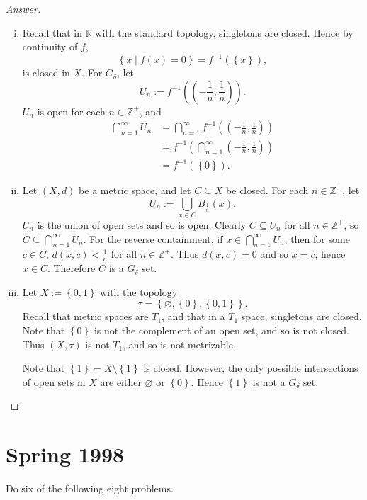\documentclass[12pt]{article}
\newcommand{\z}{\mathbb{Z}}
\newcommand{\real}{\mathbb{R}}
\newcommand\inv[1]{#1^{-1}}
\newcommand\paren[1]{\left( #1 \right)}
\newcommand\setb[1]{\left \{ #1 \right \}}
\theoremstyle{definition}
\begin{document}
\begin{proof}[Answer]
    \noindent
    \begin{enumerate}[(i)]
        \item Recall that in $\real$ with the standard topology, singletons are closed. Hence by continuity of $f$, 
        \[
            \setb{ x \mid f(x) = 0 } = \inv{f} \paren{ \setb{ x } },
        \]
        is closed in $X$. For $G_{\delta}$, let 
        \[
            U_n := \inv{f} \paren{ \paren{ -\frac{1}{n} , \frac{1}{n} } }.
        \]
        $U_n$ is open for each $n \in \z^+$, and 
        \begin{align*}
            \bigcap\limits_{n = 1}^{\infty} U_n & = \bigcap\limits_{n = 1}^{\infty} \inv{f} \paren{ \paren{ -\frac{1}{n} , \frac{1}{n} } } \\
            & = \inv{f} \paren{ \bigcap\limits_{n = 1}^{\infty} \paren{ -\frac{1}{n} , \frac{1}{n} } } \\
            & = \inv{f} \paren{ \setb{0} }.
        \end{align*}
        \item Let $(X,d)$ be a metric space, and let $C \subseteq X$ be closed. For each $n \in \z^+$, let 
        \[
            U_n := \bigcup\limits_{x \in C} B_{\frac{1}{n}}(x).
        \]
        $U_n$ is the union of open sets and so is open. Clearly $C \subseteq U_n$ for all $n \in \z^+$, so $C \subseteq \bigcap\limits_{n = 1}^{\infty} U_n$. For the reverse containment, if $x \in \bigcap\limits_{n = 1}^{\infty} U_n$, then for some $c \in C$, $d(x,c) < \frac{1}{n}$ for all $n \in \z^+$. Thus $d(x,c) = 0$ and so $x = c$, hence $x \in C$. Therefore $C$ is a $G_{\delta}$ set.
        \item Let $X := \setb{ 0 , 1 }$ with the topology 
        \[
            \tau = \setb{ \varnothing , \setb{0} , \setb{0,1} }.
        \]
        Recall that metric spaces are $T_1$, and that in a $T_1$ space, singletons are closed. Note that $\setb{0}$ is not the complement of an open set, and so is not closed. Thus $(X,\tau)$ is not $T_1$, and so is not metrizable.
        
        Note that $\setb{1} = X \setminus \setb{1}$ is closed. However, the only possible intersections of open sets in $X$ are either $\varnothing$ or $\setb{0}$. Hence $\setb{1}$ is not a $G_{\delta}$ set.
    \end{enumerate}
\end{proof}
\newpage
\section{Spring 1998}
Do six of the following eight problems.
\end{document}
